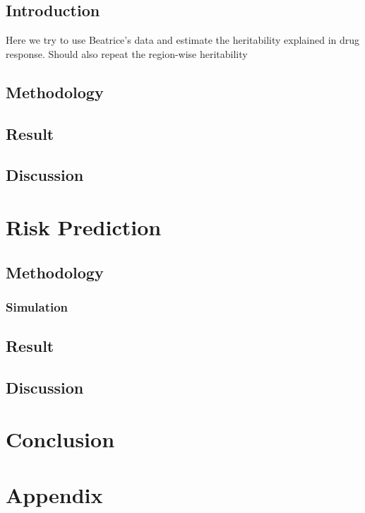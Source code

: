 \documentclass{book}
\begin{document}
	\section{Introduction}
	Here we try to use Beatrice's data and estimate the heritability explained in drug response.
	Should also repeat the region-wise heritability
	\section{Methodology}
	\section{Result}
	\section{Discussion}
	\chapter{Risk Prediction}
	\section{Methodology}
	\subsection{Simulation}
	\section{Result}
	\section{Discussion}
	\chapter{Conclusion}
	\backmatter
	\printbibliography
	\chapter*{Appendix}
\end{document}
